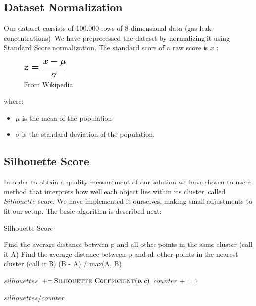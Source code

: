 \documentclass{lmproj}
\newcommand{\pluseq}{\mathrel{+}=}
\begin{document}
\subsection{Dataset Normalization}
Our dataset consists of 100.000 rows of 8-dimensional data (gas leak concentrations). We have preprocessed the dataset by normalizing it using Standard Score normalization. The standard score of a raw score is $x$ :

\begin{figure}[H]
	\centering
	\includegraphics{standard_score}
	\caption{From Wikipedia}
\end{figure}

where:
\begin{itemize}
	\item $\mu$ is the mean of the population
	\item $\sigma$ is the standard deviation of the population.
\end{itemize}

\subsection{Silhouette Score}

In order to obtain a quality measurement of our solution we have chosen to use a method that interprets how well each object lies within its cluster, called $Silhouette$ score. We have implemented it ourselves, making small adjustments to fit our setup. The basic algorithm is described next:

\bigskip


\begin{algorithm}[H]
	\caption{Silhouette Score}
	\begin{algorithmic}[1]
		\label{silhouette_coefficient}
		
			\State Find the average distance between p and all other points in the same cluster (call it A)
			\State Find the average distance between p and all other points in the nearest cluster (call it B)
			\Return (B - A) / max(A, B)
		
		\EndFunction
	\end{algorithmic}
	
	\begin{algorithmic}[1]
		\label{silhouette_score}
		
			\State $silhouettes$ $\pluseq \Call {Silhouette Coefficient}{p,c}$
			\State $counter$ $\pluseq 1$
		\EndFor
		
		\Return $silhouettes/counter$
		\EndFunction
	\end{algorithmic}
\end{algorithm}
\end{document}
